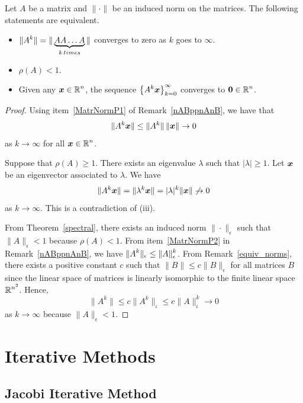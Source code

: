 \begin{theorem} \label{spect}
Let $A$ be a \nn matrix and $\|\cdot\|$ be an induced norm 
on the \nn matrices.  The following statements are
equivalent.
\begin{itemize}
\item [(i)]
$\displaystyle \| A^k \| = \|\underbrace{ A A \ldots A}_{k\,times} \|$
converges to zero as $k$ goes to $\infty$.
\item [(ii)] $\rho (A) < 1$.
\item [(iii)] Given any $\displaystyle \bm{x} \in \mathbb{R}^n$, the sequence
$\displaystyle \left\{ A^k \bm{x}\right\}_{k=0}^\infty$ converges to
$\displaystyle \bm{0} \in \mathbb{R}^n$.
\end{itemize}
\end{theorem}

\begin{proof}
Using item~\ref{MatrNormP1} of Remark~\ref{nABppnAnB}, we have that
\[
\|A^k \bm{x} \| \leq \|A^k\|\, \|\bm{x} \| \rightarrow 0
\]
as $k\rightarrow \infty$ for all $\displaystyle \bm{x}\in \mathbb{R}^n$.

  Suppose that $\rho(A) \geq 1$.
There exists an eigenvalue $\lambda$ such that $|\lambda|\geq 1$.
Let $\bm{x}$ be an eigenvector associated to $\lambda$.
We have
\[
\| A^k\bm{x} \| = \| \lambda^k \bm{x} \| = |\lambda|^k \|\bm{x}\|
\not\rightarrow 0
\]
as $k\rightarrow \infty$.  This is a contradiction of (iii).

 From Theorem~\ref{spectral}, there
exists an induced norm $\|\cdot\|_\epsilon$ such that
$\|A\|_\epsilon < 1$ because $\rho(A) < 1$.  From
item~\ref{MatrNormP2} in Remark~\ref{nABppnAnB}, we have
$\displaystyle \|A^k\|_\epsilon \leq \|A\|_\epsilon^k$.
From Remark~\ref{equiv_norms}, there exists
a positive constant $c$ such that $\|B\| \leq c \|B\|_\epsilon$ for
all \nn matrices $B$ since the linear space of \nn matrices is
linearly isomorphic to the finite linear space
$\displaystyle \mathbb{R}^{n^2}$.  Hence,
\[
\|A^k\| \leq c\|A^k\|_\iota \leq c \|A\|_\iota^k \rightarrow 0
\]
as $k\rightarrow \infty$ because $\|A\|_\epsilon < 1$.
\end{proof}

\section{Iterative Methods}

\subsection{Jacobi Iterative Method}

